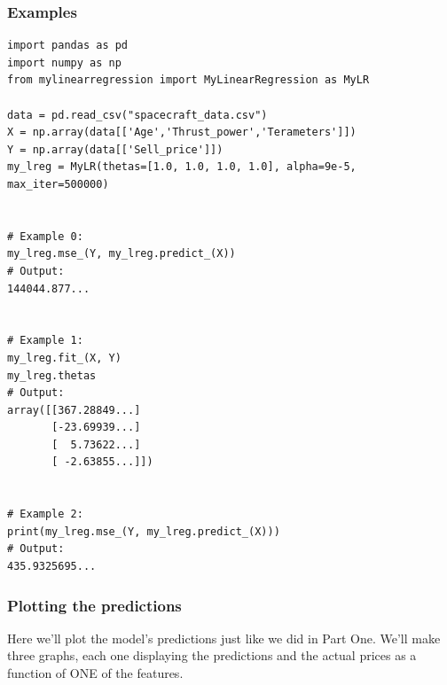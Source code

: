 \documentclass{42-en}
\begin{document}

\subsubsection*{Examples}
\begin{verbatim}
import pandas as pd
import numpy as np
from mylinearregression import MyLinearRegression as MyLR

data = pd.read_csv("spacecraft_data.csv")
X = np.array(data[['Age','Thrust_power','Terameters']])
Y = np.array(data[['Sell_price']])
my_lreg = MyLR(thetas=[1.0, 1.0, 1.0, 1.0], alpha=9e-5, max_iter=500000)


# Example 0:
my_lreg.mse_(Y, my_lreg.predict_(X))
# Output:
144044.877...


# Example 1:
my_lreg.fit_(X, Y)
my_lreg.thetas
# Output:
array([[367.28849...]
       [-23.69939...]
       [  5.73622...]
       [ -2.63855...]])


# Example 2:
print(my_lreg.mse_(Y, my_lreg.predict_(X)))
# Output:
435.9325695...
\end{verbatim}

\subsubsection*{Plotting the predictions}
Here we'll plot the model's predictions just like we did in Part One.
We'll make three graphs, each one displaying the predictions and the actual prices as a function of ONE of the features.
\end{document}
